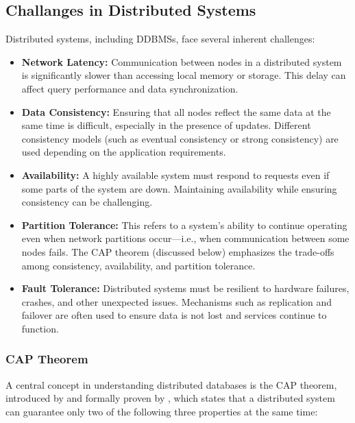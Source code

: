 \subsection{Challanges in Distributed Systems}
Distributed systems, including DDBMSs, face several inherent challenges:
\begin{itemize}
	\item \textbf{Network Latency:} Communication between nodes in a distributed system is significantly slower than accessing local memory or storage.
		This delay can affect query performance and data synchronization.

	\item \textbf{Data Consistency:} Ensuring that all nodes reflect the same data at the same time is difficult, especially in the presence of updates.
		Different consistency models (such as eventual consistency or strong consistency) are used depending on the application requirements.

	\item \textbf{Availability:} A highly available system must respond to requests even if some parts of the system are down.
		Maintaining availability while ensuring consistency can be challenging.

	\item \textbf{Partition Tolerance:} This refers to a system's ability to continue operating even when network partitions occur—i.e., when communication between some nodes fails.
		The CAP theorem (discussed below) emphasizes the trade-offs among consistency, availability, and partition tolerance.

	\item \textbf{Fault Tolerance:} Distributed systems must be resilient to hardware failures, crashes, and other unexpected issues.
		Mechanisms such as replication and failover are often used to ensure data is not lost and services continue to function.
\end{itemize}

\subsubsection{CAP Theorem}
A central concept in understanding distributed databases is the CAP theorem, introduced by \parencite{brewerRobustDistributedSystems2000} and formally proven by \parencite{gilbertBrewersConjectureFeasibility2002}, which states that a distributed system can guarantee only two of the following three properties at the same time:

